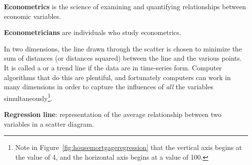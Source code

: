 \begin{DefBox}
\textbf{Econometrics} is the science of examining and quantifying relationships between economic variables.

\textbf{Econometricians} are individuals who study econometrics.
\end{DefBox}

In two dimensions, the line drawn through the scatter is chosen to minimize the sum of distances (or distances squared) between the line and the various points. It is called a  or a trend line if the data are in time-series form. Computer algorithms that do this are plentiful, and fortunately computers can work in many dimensions in order to capture the influences of \textit{all} the variables simultaneously\footnote{Note in Figure~\ref{fig:housemortgageregression} that the vertical axis begins at the value of 4, and the horizontal axis begins at a value of 100.}.

\begin{DefBox}
\textbf{Regression line}: representation of the average relationship between two variables in a scatter diagram.
\end{DefBox}



